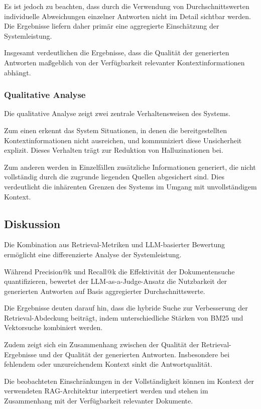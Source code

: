 Es ist jedoch zu beachten, dass durch die Verwendung von Durchschnittswerten individuelle Abweichungen einzelner Antworten nicht im Detail sichtbar werden. Die Ergebnisse liefern daher primär eine aggregierte Einschätzung der Systemleistung.

Insgesamt verdeutlichen die Ergebnisse, dass die Qualität der generierten Antworten maßgeblich von der Verfügbarkeit relevanter Kontextinformationen abhängt.

\subsubsection{Qualitative Analyse}

Die qualitative Analyse zeigt zwei zentrale Verhaltensweisen des Systems.

Zum einen erkennt das System Situationen, in denen die bereitgestellten Kontextinformationen nicht ausreichen, und kommuniziert diese Unsicherheit explizit. Dieses Verhalten trägt zur Reduktion von Halluzinationen bei.

Zum anderen werden in Einzelfällen zusätzliche Informationen generiert, die nicht vollständig durch die zugrunde liegenden Quellen abgesichert sind. Dies verdeutlicht die inhärenten Grenzen des Systems im Umgang mit unvollständigem Kontext.

\subsection{Diskussion}

Die Kombination aus Retrieval-Metriken und LLM-basierter Bewertung ermöglicht eine differenzierte Analyse der Systemleistung.

Während Precision@k und Recall@k die Effektivität der Dokumentensuche quantifizieren, bewertet der LLM-as-a-Judge-Ansatz die Nutzbarkeit der generierten Antworten auf Basis aggregierter Durchschnittswerte.

Die Ergebnisse deuten darauf hin, dass die hybride Suche zur Verbesserung der Retrieval-Abdeckung beiträgt, indem unterschiedliche Stärken von BM25 und Vektorsuche kombiniert werden.

Zudem zeigt sich ein Zusammenhang zwischen der Qualität der Retrieval-Ergebnisse und der Qualität der generierten Antworten. Insbesondere bei fehlendem oder unzureichendem Kontext sinkt die Antwortqualität.

Die beobachteten Einschränkungen in der Vollständigkeit können im Kontext der verwendeten RAG-Architektur interpretiert werden und stehen im Zusammenhang mit der Verfügbarkeit relevanter Dokumente.

